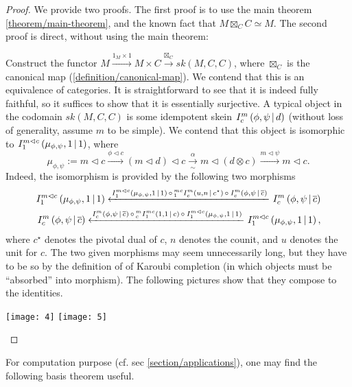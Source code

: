 \begin{proof}
  We provide two proofs. The first proof is to use the main theorem
  \ref{theorem/main-theorem}, and the known fact that
  $M \boxtimes_{C} C \simeq M$. The second proof is direct, without using the
  main theorem:

  Construct the functor
  $M \xrightarrow{1_{M} \times 1} M \times C \xrightarrow{\boxtimes_{C}} sk(M,C,C)$,
  where $\boxtimes_{C}$ is the canonical map (\ref{definition/canonical-map}).
  We contend that this is an equivalence of categories. It is straightforward
  to see that it is indeed fully faithful, so it suffices to show that it is
  essentially surjective. A typical object in the codomain $sk(M,C,C)$ is some
  idempotent skein ${}^{}_{} I^{m}_{c} \left( \phi, \psi \,\middle|\, d \right)$ (without loss of generality,
  assume $m$ to be simple). We contend that this object is isomorphic to
  ${}^{}_{} I^{m \lhd c}_{1} \left( \mu_{\phi, \psi}, 1 \,\middle|\, 1 \right)$, where
  \[
    \mu_{\phi,\psi} :=
    m \lhd c
    \xrightarrow{\phi \lhd c}
    (m \lhd d) \lhd c
    \xrightarrow[\sim]{\alpha}
    m \lhd (d \otimes c)
    \xrightarrow{m \lhd \psi}
    m \lhd c.
  \]
  Indeed, the isomorphism is provided by the following two morphisms
  \begin{align*}
    {}^{}_{} I^{m \lhd c}_{1} \left( \mu_{\phi, \psi}, 1 \,\middle|\, 1 \right)
    \xleftarrow{
    {}^{}_{} I^{m \lhd c}_{1} \left( \mu_{\phi, \psi}, 1 \,\middle|\, 1 \right)
    \, \circ \,
    {}^{mc}_{1} I^{m}_{c} \left( u, n \,\middle|\, c^{\star} \right)
    \, \circ \,
    {}^{}_{} I^{m}_{c} \left( \phi, \psi \,\middle|\, \overline{c} \right)}
    {}^{}_{} I^{m}_{c} \left( \phi, \psi \,\middle|\, \overline{c} \right)
    \\
    {}^{}_{} I^{m}_{c} \left( \phi, \psi \,\middle|\, \overline{c} \right)
    \xleftarrow{
    {}^{}_{} I^{m}_{c} \left( \phi, \psi \,\middle|\, \overline{c} \right)
    \, \circ \,
    {}^{m}_{c} I^{mc}_{1} \left( 1, 1 \,\middle|\, c \right)
    \, \circ \,
    {}^{}_{} I^{m \lhd c}_{1} \left( \mu_{\phi, \psi}, 1 \,\middle|\, 1 \right)
    }
    {}^{}_{} I^{m \lhd c}_{1} \left( \mu_{\phi, \psi}, 1 \,\middle|\, 1 \right),
  \end{align*}
  where $c^{\star}$ denotes the pivotal dual of $c$, $n$ denotes the counit,
  and $u$ denotes the unit for $c$. The two given morphisms may seem
  unnecessarily long, but they have to be so by the definition of of Karoubi
  completion (in which objects must be ``absorbed'' into morphism). The following pictures show that they compose to the identities.
  \begin{center}
    \texttt{[image: 4]}
    \texttt{[image: 5]}
  \end{center}
\end{proof}

\noindent For computation purpose (cf. sec \ref{section/applications}), one
may find the following basis theorem useful.


